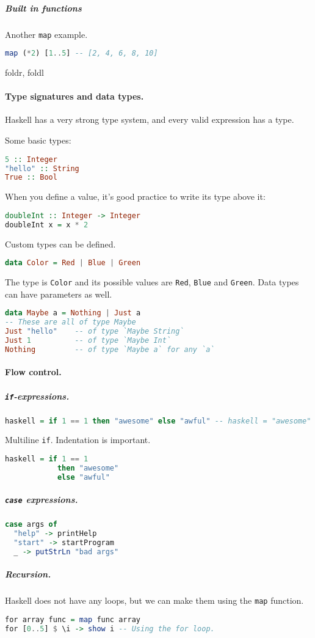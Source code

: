 \subparagraph{Built in functions}

Another \texttt{map} example.
\begin{lstlisting}[language=haskell, style=snippet]
map (*2) [1..5] -- [2, 4, 6, 8, 10]
\end{lstlisting}

foldr, foldl

\paragraph{Type signatures and data types.}
Haskell has a very strong type system, and every valid expression has a type.

Some basic types:
\begin{lstlisting}[language=haskell, style=snippet]
5 :: Integer
"hello" :: String
True :: Bool
\end{lstlisting}

When you define a value, it's good practice to write its type above it:
\begin{lstlisting}[language=haskell, style=snippet]
doubleInt :: Integer -> Integer
doubleInt x = x * 2
\end{lstlisting}

Custom types can be defined.
\begin{lstlisting}[language=haskell, style=snippet]
data Color = Red | Blue | Green
\end{lstlisting}
The type is \texttt{Color} and its possible values are \texttt{Red}, \texttt{Blue} and \texttt{Green}.
Data types can have parameters as well.
\begin{lstlisting}[language=haskell, style=snippet]
data Maybe a = Nothing | Just a
-- These are all of type Maybe
Just "hello"    -- of type `Maybe String`
Just 1          -- of type `Maybe Int`
Nothing         -- of type `Maybe a` for any `a`
\end{lstlisting}

\paragraph{Flow control.}
\subparagraph{\texttt{if}-expressions.}
\begin{lstlisting}[language=haskell, style=snippet]
haskell = if 1 == 1 then "awesome" else "awful" -- haskell = "awesome"
\end{lstlisting}
Multiline \texttt{if}. Indentation is important.
\begin{lstlisting}[language=haskell, style=snippet]
haskell = if 1 == 1
            then "awesome"
            else "awful"
\end{lstlisting}
\subparagraph{\texttt{case} expressions.}
\begin{lstlisting}[language=haskell, style=snippet]
case args of
  "help" -> printHelp
  "start" -> startProgram
  _ -> putStrLn "bad args"
\end{lstlisting}
\subparagraph{Recursion.} Haskell does not have any loops, but we can make them using the \texttt{map} function.
\begin{lstlisting}[language=haskell, style=snippet]
for array func = map func array
for [0..5] $ \i -> show i -- Using the for loop.
\end{lstlisting}



